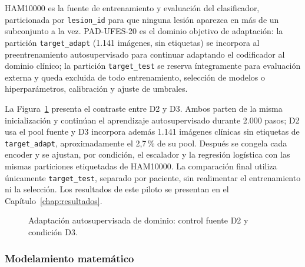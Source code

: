 HAM10000 es la fuente de entrenamiento y evaluación del clasificador, particionada por \texttt{lesion\_id} para que ninguna lesión aparezca en más de un subconjunto a la vez. PAD-UFES-20 es el dominio objetivo de adaptación: la partición \texttt{target\_adapt} (1.141 imágenes, sin etiquetas) se incorpora al preentrenamiento autosupervisado para continuar adaptando el codificador al dominio clínico; la partición \texttt{target\_test} se reserva íntegramente para evaluación externa y queda excluida de todo entrenamiento, selección de modelos o hiperparámetros, calibración y ajuste de umbrales.

La Figura~\ref{fig:flujo-adaptacion-dominio} presenta el contraste entre D2 y D3. Ambos parten de la misma inicialización y continúan el aprendizaje autosupervisado durante 2.000 pasos; D2 usa el pool fuente y D3 incorpora además 1.141 imágenes clínicas sin etiquetas de \texttt{target\_adapt}, aproximadamente el 2,7\,\% de su pool. Después se congela cada encoder y se ajustan, por condición, el escalador y la regresión logística con las mismas particiones etiquetadas de HAM10000. La comparación final utiliza únicamente \texttt{target\_test}, separado por paciente, sin realimentar el entrenamiento ni la selección. Los resultados de este piloto se presentan en el Capítulo~\ref{chap:resultados}.

\begin{figure}[!htbp]
\caption{Adaptación autosupervisada de dominio: control fuente D2 y condición D3.}
\label{fig:flujo-adaptacion-dominio}
\centering

\par\smallskip
\raggedright\fontsize{11}{13}\selectfont\singlespacing
\par{}
\par
\end{figure}

\subsubsection{Modelamiento matemático}
\label{sec:modelamiento-clasificador}

